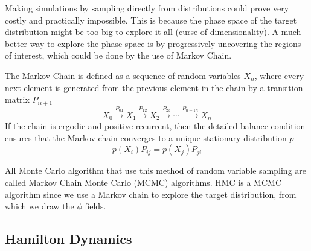 Making simulations by sampling directly from distributions could prove very costly and practically impossible. This is because the phase space of the target distribution might be too big to explore it all (curse of dimensionality). A much better way to explore the phase space is by progressively uncovering the regions of interest, which could be done by the use of Markov Chain.

The Markov Chain is defined as a sequence of random variables $X_n$, where every next element is generated from the previous element in the chain by a transition matrix $P_{ii+1}$
\begin{equation}
    X_0 \xrightarrow{P_{01}} X_1 \xrightarrow{P_{12}} X_2 \xrightarrow{P_{23}} \cdots \xrightarrow{P_{n-1n}} X_n
\end{equation}
If the chain is ergodic and positive recurrent, then the detailed balance condition ensures that the Markov chain converges to a unique stationary distribution $p$
\begin{equation}
    p(X_i) P_{ij} = p(X_j) P_{ji}
\end{equation}

All Monte Carlo algorithm that use this method of random variable sampling are called Markov Chain Monte Carlo (MCMC) algorithms. HMC is a MCMC algorithm since we use a Markov chain to explore the target distribution, from which we draw the $\phi$ fields.

\subsection{Hamilton Dynamics}

